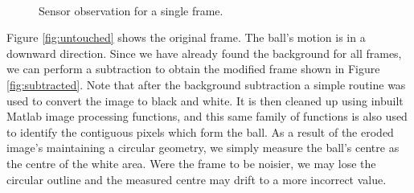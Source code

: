 \begin{figure}[h]
\centering
{}
 \\
\caption{Sensor observation for a single frame.}
\label{fig:observation}
\end{figure}

Figure \ref{fig:untouched} shows the original frame. The ball's motion is in
a downward direction. Since we have already found the background for all frames,
we can perform a subtraction to obtain the modified frame shown in Figure
\ref{fig:subtracted}. Note that after the background subtraction a simple
routine was used to convert the image to black and white.
It is then cleaned up using inbuilt Matlab image processing
functions, and this same family of functions is also used to identify the contiguous
pixels which form the ball. As a result of the eroded image's maintaining
a circular geometry, we simply measure the ball's centre as the centre of the
white area. Were the frame to be noisier, we may lose the circular outline and
the measured centre may drift to a more incorrect value.

